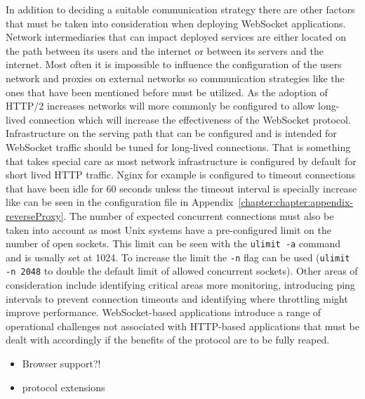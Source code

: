 In addition to deciding a suitable communication strategy there are other factors that must be taken into consideration when deploying WebSocket applications. Network intermediaries that can impact deployed services are either located on the path between its users and the internet or between its servers and the internet. Most often it is impossible to influence the configuration of the users network and proxies on external networks so communication strategies like the ones that have been mentioned before must be utilized. As the adoption of HTTP/2 increases networks will more commonly be configured to allow long-lived connection which will increase the effectiveness of the WebSocket protocol. Infrastructure on the serving path that can be configured and is intended for WebSocket traffic should be tuned for long-lived connections. That is something that takes special care as most network infrastructure is configured by default for short lived HTTP traffic. Nginx for example is configured to timeout connections that have been idle for 60 seconds unless the timeout interval is specially increase like can be seen in the configuration file in Appendix~\ref{chapter:chapter:appendix-reverseProxy}. The number of expected concurrent connections must also be taken into account as most Unix systems have a pre-configured limit on the number of open sockets. This limit can be seen with the \texttt{ulimit -a} command and is usually set at 1024. To increase the limit the \texttt{-n} flag can be used (\texttt{ulimit -n 2048} to double the default limit of allowed concurrent sockets). Other areas of consideration include identifying critical areas more monitoring, introducing ping intervals to prevent connection timeouts and identifying where throttling might improve performance. WebSocket-based applications introduce a range of operational challenges not associated with HTTP-based applications that must be dealt with accordingly if the benefits of the protocol are to be fully reaped.

\begin{itemize}
\item Browser support?!
\item protocol extensions

\end{itemize}